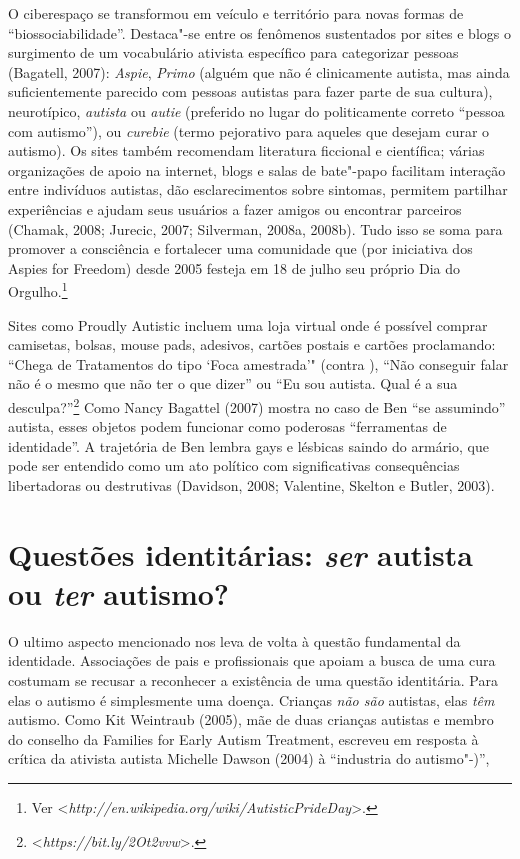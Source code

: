 O ciberespaço se transformou em veículo e território para novas formas
de ``biossociabilidade''. Destaca"-se entre os fenômenos sustentados por
sites e blogs o surgimento de um vocabulário ativista específico para
categorizar pessoas (Bagatell, 2007): \emph{Aspie}, \emph{Primo} (alguém
que não é clinicamente autista, mas ainda suficientemente parecido com
pessoas autistas para fazer parte de sua cultura), neurotípico,
\emph{autista} ou \emph{autie} (preferido no lugar do politicamente
correto ``pessoa com autismo''), ou \emph{curebie} (termo pejorativo
para aqueles que desejam curar o autismo). Os sites também recomendam
literatura ficcional e científica; várias organizações de apoio na
internet, blogs e salas de bate"-papo facilitam interação entre
indivíduos autistas, dão esclarecimentos sobre sintomas, permitem
partilhar experiências e ajudam seus usuários a fazer amigos ou
encontrar parceiros (Chamak, 2008; Jurecic, 2007; Silverman, 2008a,
2008b). Tudo isso se soma para promover a consciência e fortalecer uma
comunidade que (por iniciativa dos Aspies for Freedom) desde 2005
festeja em 18 de julho seu próprio Dia do Orgulho.\footnote[18]{Ver \textless{}\emph{http://en.wikipedia.org/wiki/AutisticPrideDay}\textgreater{}.}

Sites como Proudly Autistic incluem uma loja virtual onde é possível
comprar camisetas, bolsas, mouse pads, adesivos, cartões postais e
cartões proclamando: ``Chega de Tratamentos do tipo `Foca amestrada'"
(contra ), ``Não conseguir falar não é o mesmo que não ter o que
dizer'' ou ``Eu sou autista. Qual é a sua
desculpa?''\footnote[19]{\textless{}\emph{https://bit.ly/2Ot2vvw}\textgreater{}.} Como Nancy Bagattel (2007) mostra no
caso de Ben ``se assumindo'' autista, esses objetos podem funcionar como
poderosas ``ferramentas de identidade''. A trajetória de Ben lembra gays
e lésbicas saindo do armário, que pode ser entendido como um ato
político com significativas consequências libertadoras ou destrutivas
(Davidson, 2008; Valentine, Skelton e Butler, 2003).

\chapter{Questões identitárias: \emph{ser} autista ou \emph{ter} autismo?}

O ultimo aspecto mencionado nos leva de volta à questão fundamental da
identidade. Associações de pais e profissionais que apoiam a busca de
uma cura costumam se recusar a reconhecer a existência de uma questão
identitária. Para elas o autismo é simplesmente uma doença. Crianças
\emph{não são} autistas, elas \emph{têm} autismo. Como Kit Weintraub
(2005), mãe de duas crianças autistas e membro do conselho da Families
for Early Autism Treatment, escreveu em resposta à crítica da ativista
autista Michelle Dawson (2004) à ``industria do autismo"-)'',

